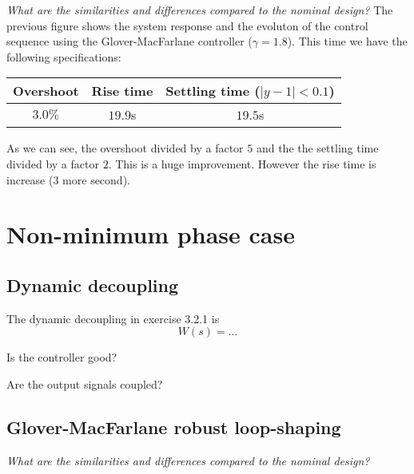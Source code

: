 \documentclass[a4paper,11pt]{article}
\newcommand{\image}[3][width=.8\columnwidth]{
	\begin{figure}[h!]
		\centering
	    \texttt{[image: \#2]}
		\caption{#3}
		\label{fig:#2}
	\end{figure}
}
\begin{document}
    \emph{What are the similarities and differences compared to the nominal design?}
    The previous figure shows the system response and the evoluton of the control sequence using the Glover-MacFarlane controller ($\gamma = 1.8$).
    This time we have the following specifications:
    \begin{center}
    \begin{tabular}{|c|c|c|}
        \hline
        Overshoot & Rise time & Settling time ($|y - 1| < 0.1$)\\
        \hline
        $3.0\%$ & $19.9$s & $19.5$s \\
        \hline
    \end{tabular}
    \end{center}
    As we can see, the overshoot divided by a factor $5$ and the the settling time divided by a factor $2$. This is a huge improvement. However the rise time is increase ($3$ more second).
    

	\section*{Non-minimum phase case}

	\subsection*{Dynamic decoupling}
	The dynamic decoupling in exercise 3.2.1 is
	\[
		W(s) = \ldots
	\]


	Is the controller good?
	\par\dotfill\par\dotfill\par
	Are the output signals coupled?
	\par\dotfill\par\dotfill

	\subsection*{Glover-MacFarlane robust loop-shaping}


    \emph{What are the similarities and differences compared to the nominal design?}
\end{document}
